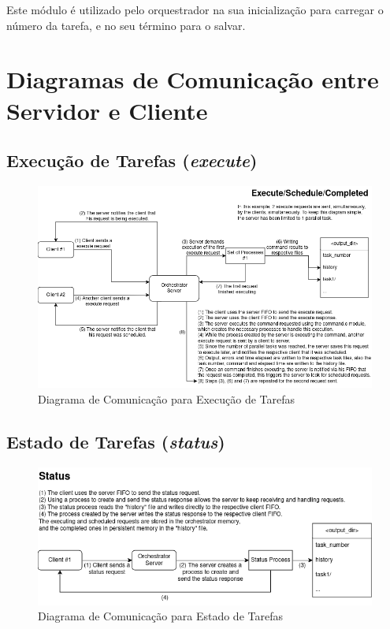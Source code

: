 \documentclass[a4paper,11pt]{scrreprt}
\begin{document}
        Este módulo é utilizado pelo orquestrador na sua inicialização para carregar o número da tarefa, e no seu término para o salvar.

    \section{Diagramas de Comunicação entre Servidor e Cliente}
        \subsection{Execução de Tarefas (\textit{execute})}
                \begin{figure}[!ht]
                    \centering
                    \includegraphics[width=\textwidth]{diagrams/execute.png}
                    \caption{Diagrama de Comunicação para Execução de Tarefas}
                    \label{fig:1.2}
                \end{figure}
        \subsection{Estado de Tarefas (\textit{status})}
            \begin{figure}[!ht]
                \centering
                \includegraphics[width=\textwidth]{diagrams/status.png}
                \caption{Diagrama de Comunicação para Estado de Tarefas}
                \label{fig:1.3}
            \end{figure}
\end{document}
